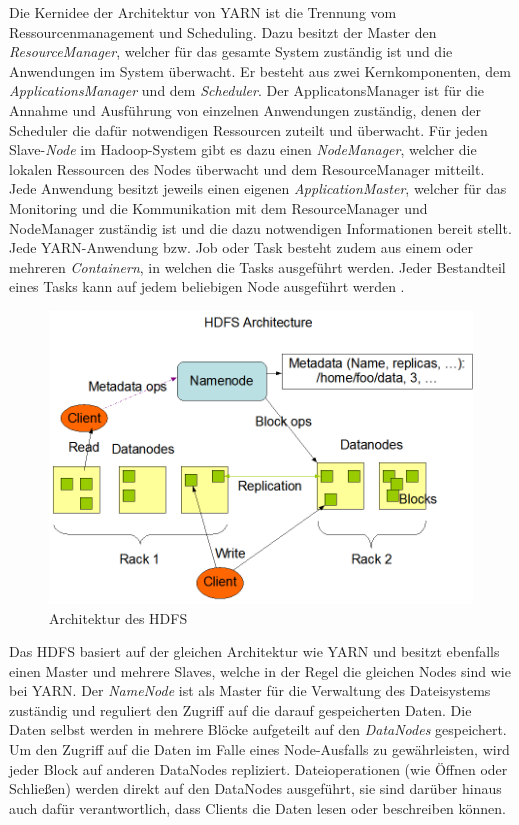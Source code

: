 Die Kernidee der Architektur von YARN ist die Trennung vom Ressourcenmanagement und Scheduling. Dazu besitzt der Master den \emph{ResourceManager}, welcher für das gesamte System zuständig ist und die Anwendungen im System überwacht. Er besteht aus zwei Kernkomponenten, dem \emph{ApplicationsManager} und dem \emph{Scheduler}. Der ApplicatonsManager ist für die Annahme und Ausführung von einzelnen Anwendungen zuständig, denen der Scheduler die dafür notwendigen Ressourcen zuteilt und überwacht. Für jeden Slave-\emph{Node} im Hadoop-System gibt es dazu einen \emph{NodeManager}, welcher die lokalen Ressourcen des Nodes überwacht und dem ResourceManager mitteilt. Jede Anwendung besitzt jeweils einen eigenen \emph{ApplicationMaster}, welcher für das Monitoring und die Kommunikation mit dem ResourceManager und NodeManager zuständig ist und die dazu notwendigen Informationen bereit stellt. Jede YARN-Anwendung bzw. Job oder Task besteht zudem aus einem oder mehreren \emph{Containern}, in welchen die Tasks ausgeführt werden. Jeder Bestandteil eines Tasks kann auf jedem beliebigen Node ausgeführt werden \cite{HadoopYarnDesc272}.

\begin{figure}
    \centering
    \includegraphics[width=\columnwidth]{./images/hdfsarchitecture.png}
    \caption[Architektur des HDFS]{Architektur des HDFS \cite{HadoopHdfsDesc272}}
    \label{fig:hdfsarch}
\end{figure}

Das HDFS basiert auf der gleichen Architektur wie YARN und besitzt ebenfalls einen Master und mehrere Slaves, welche in der Regel die gleichen Nodes sind wie bei YARN. Der \emph{NameNode} ist als Master für die Verwaltung des Dateisystems zuständig und reguliert den Zugriff auf die darauf gespeicherten Daten. Die Daten selbst werden in mehrere Blöcke aufgeteilt auf den \emph{DataNodes} gespeichert. Um den Zugriff auf die Daten im Falle eines Node-Ausfalls zu gewährleisten, wird jeder Block auf anderen DataNodes repliziert. Dateioperationen (wie Öffnen oder Schließen) werden direkt auf den DataNodes ausgeführt, sie sind darüber hinaus auch dafür verantwortlich, dass Clients die Daten lesen oder beschreiben können.


